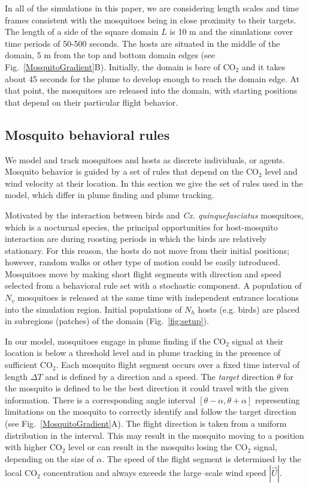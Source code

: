 \documentclass[10pt]{article}
\begin{document}
In all of the simulations in this paper, we are considering length scales and time frames consistent with the mosquitoes being in close proximity to their targets. The length of a side of the square domain $L$ is 10 m and the simulations cover time periods of 50-500 seconds. The hosts are situated in the middle of the domain, 5 m from the top and bottom domain edges (see Fig.~\ref{MosquitoGradient}B). Initially, the domain is bare of CO$_2$ and it takes about 45 seconds for the plume to develop enough to reach the domain edge. At that point, the mosquitoes are released into the domain, with starting positions that depend on their particular flight behavior.

\subsection*{Mosquito behavioral rules}
We model and track mosquitoes and hosts as discrete individuals, or agents.  Mosquito behavior is 
guided by a set of rules that depend on the CO$_2$ level and wind velocity at their location.  In this
section we give the set of rules used in the model, which differ in plume finding and plume tracking. 

Motivated by the interaction between birds and \textsl{Cx. quinquefasciatus}
mosquitoes, which is a nocturnal species, the principal
opportunities for host-mosquito interaction are during roosting
periods in which the birds are relatively stationary. For this
reason, the hosts do not move from
their initial positions; however, random walks or other type of
motion could be easily introduced. Mosquitoes move by making short flight segments with
direction and speed selected from a behavioral rule set with a stochastic component.
%
A population of $N_v$ mosquitoes is released at the same time with independent entrance locations into the simulation region. Initial populations of $N_h$ hosts (e.g. birds) are placed in subregions (patches) of the domain 
(Fig.~\ref{fig:setup}).

In our model, mosquitoes engage in plume finding if the CO$_2$ signal at their location
is below a threshold level and in plume tracking in the presence of sufficient CO$_2$.
Each mosquito flight segment occurs over a fixed time 
interval of length $\Delta T$ and is defined by a direction and a 
speed.  The \textit{target} direction $\theta$ for the mosquito is defined to be the best direction it could travel with the given information. There is a corresponding angle interval
$[\theta-\alpha, \theta+\alpha]$ representing limitations on the mosquito to correctly identify and follow the target direction (see Fig.~\ref{MosquitoGradient}A).  The flight direction is taken from a uniform distribution in the
interval. This may result in the mosquito moving to a position with higher CO$_2$ level or 
can result in the mosquito losing the  CO$_2$ signal, depending on the size of $\alpha$. The speed of the flight segment is determined by the local
CO$_2$ concentration and always exceeds the large--scale wind speed $|\vec{U}|$. 
\end{document}
